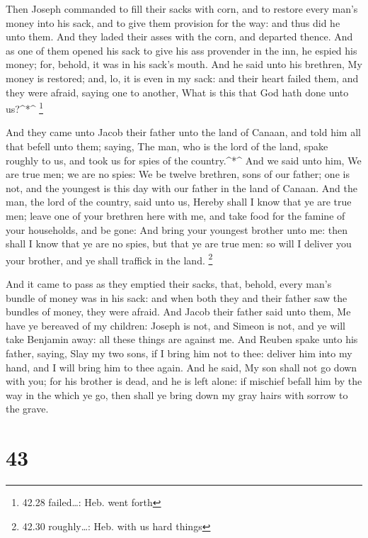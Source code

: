  Then Joseph commanded to fill their sacks with corn, and
to restore every man's money into his sack, and to give them provision
for the way: and thus did he unto them.  And they laded
their asses with the corn, and departed thence.  And as one
of them opened his sack to give his ass provender in the inn, he espied
his money; for, behold, it was in his sack's mouth.  And he
said unto his brethren, My money is restored; and, lo, it is even in my
sack: and their heart failed them, and they were afraid, saying one to
another, What is this that God hath done unto us?\^{}*\^{} \footnote{42.28
  failed\ldots: Heb. went forth}

 And they came unto Jacob their father unto the land of
Canaan, and told him all that befell unto them; saying, 
The man, who is the lord of the land, spake roughly to us, and took us
for spies of the country.\^{}*\^{}  And we said unto him,
We are true men; we are no spies:  We be twelve brethren,
sons of our father; one is not, and the youngest is this day with our
father in the land of Canaan.  And the man, the lord of the
country, said unto us, Hereby shall I know that ye are true men; leave
one of your brethren here with me, and take food for the famine of your
households, and be gone:  And bring your youngest brother
unto me: then shall I know that ye are no spies, but that ye are true
men: so will I deliver you your brother, and ye shall traffick in the
land. \footnote{42.30 roughly\ldots: Heb. with us hard things}

 And it came to pass as they emptied their sacks, that,
behold, every man's bundle of money was in his sack: and when both they
and their father saw the bundles of money, they were afraid.
 And Jacob their father said unto them, Me have ye bereaved
of my children: Joseph is not, and Simeon is not, and ye will take
Benjamin away: all these things are against me.  And Reuben
spake unto his father, saying, Slay my two sons, if I bring him not to
thee: deliver him into my hand, and I will bring him to thee again.
 And he said, My son shall not go down with you; for his
brother is dead, and he is left alone: if mischief befall him by the way
in the which ye go, then shall ye bring down my gray hairs with sorrow
to the grave.

\hypertarget{section-42}{%
\section{43}\label{section-42}}

